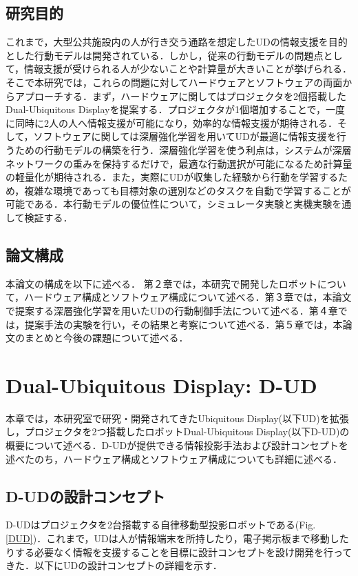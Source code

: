 \documentclass[12pt]{sonota/aislab}
\begin{document}
\section{研究目的}
これまで，大型公共施設内の人が行き交う通路を想定したUDの情報支援を目的とした行動モデルは開発されている．しかし，従来の行動モデルの問題点として，情報支援が受けられる人が少ないことや計算量が大きいことが挙げられる．そこで本研究では，これらの問題に対してハードウェアとソフトウェアの両面からアプローチする．まず，ハードウェアに関してはプロジェクタを2個搭載したDual-Ubiquitous Displayを提案する．プロジェクタが1個増加することで，一度に同時に2人の人へ情報支援が可能になり，効率的な情報支援が期待される．そして，ソフトウェアに関しては深層強化学習を用いてUDが最適に情報支援を行うための行動モデルの構築を行う．深層強化学習を使う利点は，システムが深層ネットワークの重みを保持するだけで，最適な行動選択が可能になるため計算量の軽量化が期待される．また，実際にUDが収集した経験から行動を学習するため，複雑な環境であっても目標対象の選別などのタスクを自動で学習することが可能である．本行動モデルの優位性について，シミュレータ実験と実機実験を通して検証する．

\section{論文構成}
本論文の構成を以下に述べる．
第２章では，本研究で開発したロボットについて，ハードウェア構成とソフトウェア構成について述べる．第３章では，本論文で提案する深層強化学習を用いたUDの行動制御手法について述べる．第４章では，提案手法の実験を行い，その結果と考察について述べる．第５章では，本論文のまとめと今後の課題について述べる．


\chapter{Dual-Ubiquitous Display: D-UD}\label{chap:d_ud_mechanism}
本章では，本研究室で研究・開発されてきたUbiquitous Display(以下UD)を拡張し，プロジェクタを2つ搭載したロボットDual-Ubiquitous Display(以下D-UD)の概要について述べる．D-UDが提供できる情報投影手法および設計コンセプトを述べたのち，ハードウェア構成とソフトウェア構成についても詳細に述べる．

\section{D-UDの設計コンセプト}
D-UDはプロジェクタを2台搭載する自律移動型投影ロボットである(Fig.\ref{DUD})．これまで，UDは人が情報端末を所持したり，電子掲示板まで移動したりする必要なく情報を支援することを目標に設計コンセプトを設け開発を行ってきた\cite{UD1}．以下にUDの設計コンセプトの詳細を示す．
\end{document}
